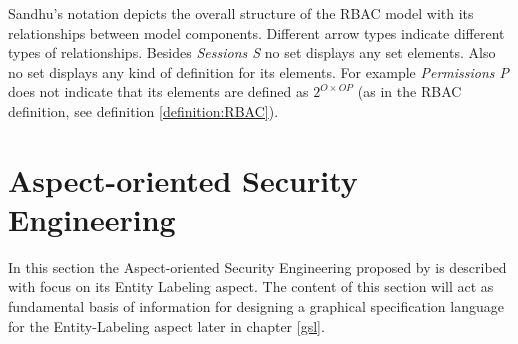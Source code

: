 \documentclass[twoside, openright, 12pt]{book}
\begin{document}
Sandhu's notation depicts the overall structure of the RBAC model with its relationships between model components.
Different arrow types indicate different types of relationships.
Besides \textit{Sessions S} no set displays any set elements.
Also no set displays any kind of definition for its elements.
For example \textit{Permissions P} does not indicate that its elements are defined as $2^{O \times \mathit{OP}}$ (as in the RBAC definition, see definition \ref{definition:RBAC}).








\section{Aspect-oriented Security Engineering}
\label{AOSE}
In this section the Aspect-oriented Security Engineering proposed by \cite{Amthor18} is described with focus on its Entity Labeling aspect.
The content of this section will act as fundamental basis of information for designing a graphical specification language for the Entity-Labeling aspect later in chapter \ref{gsl}.
\end{document}
